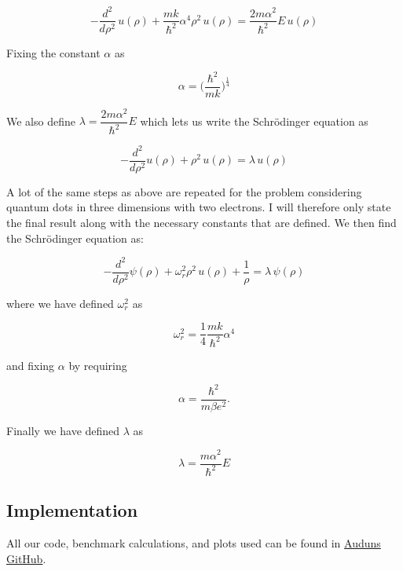 \documentclass[a4paper, fontsize=11pt]{article}
\begin{document}
\begin{equation}
-\dfrac{d^2}{d\rho^2} \, u(\rho) + \dfrac{mk}{\hbar^2} \alpha^4 \rho^2 \, u(\rho) = \dfrac{2m\alpha^2}{\hbar^2} E \, u(\rho) 
\end{equation}

Fixing the constant $\alpha$ as 

\begin{equation}
\alpha=\Big(\dfrac{\hbar^2}{mk}\Big)^{\frac{1}{4}}
\end{equation} 

We also define $\lambda=\dfrac{2m\alpha^2}{\hbar^2}E$ which lets us write the Schr\"{o}dinger equation as

\begin{equation}
-\dfrac{d^2}{d\rho^2}u(\rho) + \rho^2 \, u(\rho) = \lambda \, u(\rho)
\end{equation}

A lot of the same steps as above are repeated for the problem considering quantum dots in three dimensions with two electrons. I will therefore only state the final result along with the necessary constants that are defined. We then find the Schr\"{o}dinger equation as:

\begin{equation}
-\dfrac{d^2}{d\rho^2}\psi(\rho) + \omega^2_{r}\rho^2 \, u(\rho) + \frac{1}{\rho} = \lambda \, \psi(\rho)
\end{equation}

where we have defined  $\omega_{r}^2$ as

\begin{equation}
\omega^2_{r}=\dfrac{1}{4} \dfrac{mk}{\hbar^2} \alpha^4
\end{equation}

and fixing $\alpha$ by requiring 

\begin{equation}
\alpha = \dfrac{\hbar^2}{m\beta e^2}.
\end{equation}

Finally we have defined $\lambda$ as

\begin{equation}
\lambda=\dfrac{m\alpha^2}{\hbar^2}E
\end{equation}



\subsection{Implementation}

All our code, benchmark calculations, and plots used can be found in \href{https://github.com/auduntre/FYS4150/tree/master/Project%202}{Auduns GitHub}.
\end{document}

